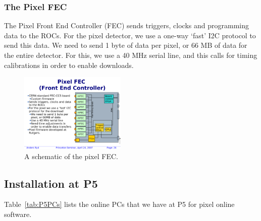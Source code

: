 \clearpage

\subsubsection{The Pixel FEC}

The Pixel Front End Controller (FEC) sends triggers, clocks 
and programming data to the ROCs. For the pixel detector, 
we use a one-way `fast' I2C protocol to send this data.
We need to send 1 byte of data per pixel, or 66 MB of data
for the entire detector. For this, we use a 40 MHz serial line, 
and this calls for timing calibrations in order to enable downloads.

\begin{figure}[h]
\begin{center}
 \includegraphics[width=0.45\textwidth]{pFEC.pdf}
\end{center}
\caption{A schematic of the pixel FEC.}
\label{fig:pFEC}
\end{figure}

\clearpage

\subsection{Installation at P5}

Table~\ref{tab:P5PCs} lists the online PCs that we have at P5
for pixel online software.


